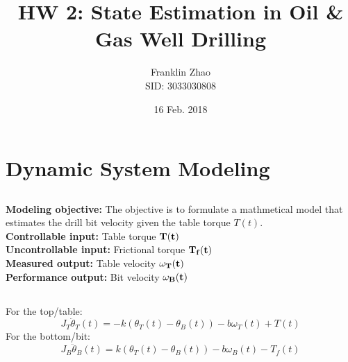 \documentclass[12pt]{article}
\title{HW 2: State Estimation in Oil \& Gas Well Drilling}
\date{16 Feb. 2018}
\author{Franklin Zhao \\ SID: 3033030808}
\begin{document}
	
	\maketitle
	\newcommand{\tabitem}{~~\llap{\textbullet}~~}
	\renewcommand\theequation{\arabic{equation}}
	\renewcommand{\figurename}{Fig.}
	\renewcommand\thesection{Problem \arabic{section}:}
	\renewcommand\thesubsection{(\alph{subsection})}
	\onehalfspacing
	
\section{Dynamic System Modeling}
\subsection{}
\textbf{Modeling objective:} The objective is to formulate a mathmetical model that estimates the drill bit velocity given the table torque $T(t)$.\\
\textbf{Controllable input:} Table torque $\bf{T(t)}$\\
\textbf{Uncontrollable input:} Frictional torque $\bf{T_f(t)}$\\
\textbf{Measured output:} Table velocity $\bf{\omega_T(t)}$\\
\textbf{Performance output:} Bit velocity $\bf{\omega_B(t)}$
\subsection{}
For the top/table:
\begin{equation}
J_T\ddot{\theta}_T(t)=-k(\theta_T(t)-\theta_B(t))-b\omega_T(t)+T(t)
\end{equation}
For the bottom/bit:
\begin{equation}
J_B\ddot{\theta}_B(t)=k(\theta_T(t)-\theta_B(t))-b\omega_B(t)-T_f(t)
\end{equation}
\end{document}
